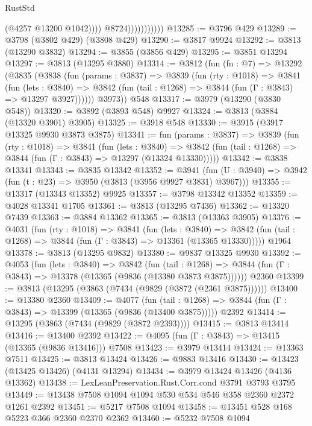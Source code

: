 \begin{lexlean}{RustStd}
\begin{coremodule}
                                (@4257 @13200 @1042))))
                          @8724)))))))))))
@13285 := @3796 @429
@13289 := @3798 (@3802 @429) (@3808 @429)
@13290 := @3817 @9924
@13292 := @3813 (@13290 @3832)
@13294 := @3855 (@3856 @429)
@13295 := @3851 @13294
@13297 := @3813 (@13295 @3880)
@13314 := @3812
    (fun (fn : @7) =>
    @13292
      (@3835
        (@3838
          (fun (params : @3837) =>
          @3839
            (fun (rty : @1018) =>
            @3841
              (fun (lets : @3840) =>
              @3842 (fun (tail : @1268) => @3844 (fun (Γ : @3843) => @13297 @3927))))))
        @3973))
    @548
@13317 := @3979 (@13290 (@3830 @548))
@13320 := @3892 (@3893 @548) @9927
@13324 := @3813 (@3884 (@13320 @3901) @3905)
@13325 := @3918 @548
@13330 := @3915 (@3917 @13325 @9930 @3873 @3875)
@13341 := fun (params : @3837) =>
  @3839
    (fun (rty : @1018) =>
    @3841
      (fun (lets : @3840) =>
      @3842 (fun (tail : @1268) => @3844 (fun (Γ : @3843) => @13297 (@13324 @13330)))))
@13342 := @3838 @13341
@13343 := @3835 @13342
@13352 := @3941
    (fun (U : @3940) => @3942 (fun (t : @23) => @3950 (@3813 (@3956 @9927 @3831) @3967)))
@13355 := @13317 (@13343 @13352) @9925
@13357 := @3798 @13342 @13352
@13359 := @4028 @13341 @1705
@13361 := @3813 (@13295 @7436)
@13362 := @13320 @7439
@13363 := @3884 @13362
@13365 := @3813 (@13363 @3905)
@13376 := @4031
    (fun (rty : @1018) =>
    @3841
      (fun (lets : @3840) =>
      @3842 (fun (tail : @1268) => @3844 (fun (Γ : @3843) => @13361 (@13365 @13330)))))
    @1964
@13378 := @3813 (@13295 @9832)
@13380 := @9837 @13325 @9930
@13392 := @4053
    (fun (lets : @3840) =>
    @3842
      (fun (tail : @1268) =>
      @3844 (fun (Γ : @3843) => @13378 (@13365 (@9836 (@13380 @3873 @3875))))))
    @2360
@13399 := @3813 (@13295 (@3863 (@7434 (@9829 (@3872 (@2361 @3875))))))
@13400 := @13380 @2360
@13409 := @4077
    (fun (tail : @1268) => @3844 (fun (Γ : @3843) => @13399 (@13365 (@9836 (@13400 @3875)))))
    @2392
@13414 := @13295 (@3863 (@7434 (@9829 (@3872 @2393))))
@13415 := @3813 @13414
@13416 := @13400 @2392
@13422 := @4095 (fun (Γ : @3843) => @13415 (@13365 (@9836 @13416))) @7508
@13423 := @3979 @13414
@13424 := @13363 @7511
@13425 := @3813 @13424
@13426 := @9883 @13416
@13430 := @13423 (@13425 @13426) (@4131 @13294)
@13434 := @3979 @13424 @13426 (@4136 @13362)
@13438 := LexLeanPreservation.Rust.Corr.cond @3791 @3793 @3795
@13449 := @13438 @7508 @1094 @1094 @530 @534 @546 @358 @2360 @2372 @1261 @2392
@13451 := @5217 @7508 @1094
@13458 := @13451 @528 @168 @5223 @366 @2360 @2370 @2362
@13460 := @5232 @7508 @1094

\end{coremodule}
\end{lexlean}
